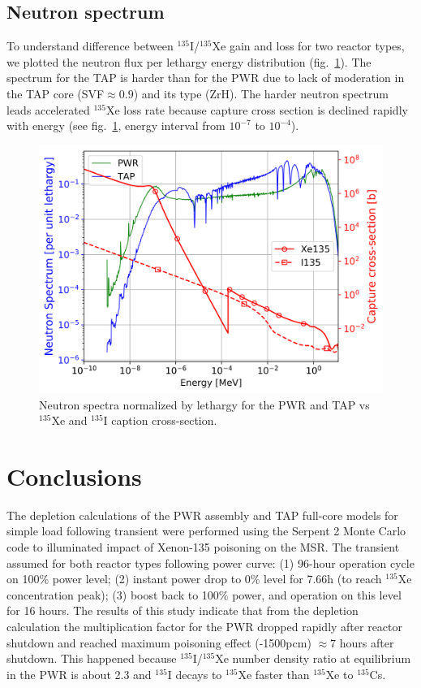 \documentclass{anstrans}
\begin{document}
\subsection{Neutron spectrum}
To understand difference between $^{135}$I/$^{135}$Xe gain and loss for two 
reactor types, we plotted the neutron flux per lethargy energy distribution 
(fig.~\ref{fig:spectrum}). The spectrum for the \gls{TAP} is harder than for 
the \gls{PWR} due to lack of moderation in the \gls{TAP} core 
(\gls{SVF}$\approx0.9$) and its type (ZrH). The harder neutron spectrum leads  
accelerated $^{135}$Xe loss rate because capture cross section is declined 
rapidly with energy (see fig.~\ref{fig:spectrum}, energy interval from 
$10^{-7}$ to $10^{-4}$).
\begin{figure}[htbp!] %
        \centering
        \includegraphics[width=1.07\linewidth]{spectra.png}
        \caption{Neutron spectra normalized by lethargy for the \gls{PWR} and 
        \gls{TAP} vs $^{135}$Xe and $^{135}$I 
        caption cross-section.}
        \label{fig:spectrum}
\end{figure}
\section{Conclusions}
The depletion calculations of the \gls{PWR} assembly and \gls{TAP} full-core  
models for simple load following transient were performed using the Serpent 2 
Monte Carlo code to illuminated impact of Xenon-135 poisoning on the \gls{MSR}.
The transient assumed for both reactor types following power curve: (1) 
96-hour operation cycle on 100\% power level; (2) instant power drop to 0\% 
level for 7.66h (to reach $^{135}$Xe concentration peak); (3) boost back to 
100\% power, and operation on this level for 16 hours. The results of this 
study indicate that from the depletion calculation the multiplication factor 
for the \gls{PWR} dropped rapidly after reactor shutdown and reached maximum 
poisoning effect (-1500pcm) $\approx7$ hours after shutdown. This 
happened because $^{135}$I/$^{135}$Xe number density ratio at equilibrium in 
the \gls{PWR} is about 2.3 and $^{135}$I decays to $^{135}$Xe faster than 
$^{135}$Xe to $^{135}$Cs.
\end{document}
